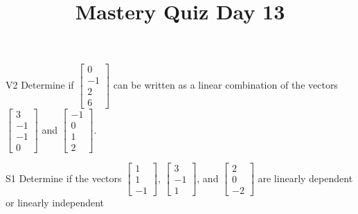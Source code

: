 \documentclass{sbgLAquiz}
\title{Mastery Quiz Day 13 }
\begin{document}
\begin{problem}{V2}
Determine if $\begin{bmatrix}0 \\ -1 \\ 2 \\ 6 \end{bmatrix}$ can be written as a linear combination of the vectors $\begin{bmatrix} 3 \\ -1 \\ -1 \\ 0 \end{bmatrix}$ and $\begin{bmatrix} -1 \\ 0 \\ 1 \\ 2 \end{bmatrix}$.
\end{problem}

\begin{problem}{S1}
Determine if the vectors $\begin{bmatrix} 1 \\ 1 \\ -1 \end{bmatrix}$, $\begin{bmatrix} 3 \\ -1 \\ 1 \end{bmatrix}$, and $\begin{bmatrix} 2 \\ 0 \\ -2 \end{bmatrix}$ are linearly dependent or linearly independent
\end{problem}
\end{document}
